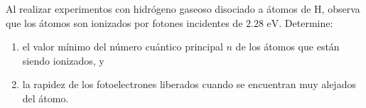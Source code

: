 \item Al realizar experimentos con hidrógeno gaseoso disociado a átomos de H, observa que los átomos son ionizados por fotones incidentes de $2.28\text{ eV}$. Determine:
\begin{enumerate}
    \item el valor mínimo del número cuántico principal $n$ de los átomos que están siendo ionizados, y
    \item la rapidez de los fotoelectrones liberados cuando se encuentran muy alejados del átomo.
\end{enumerate}